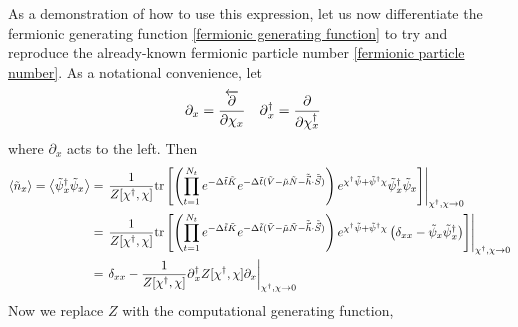 As a demonstration of how to use this expression, let us now differentiate the fermionic generating function \eqref{fermionic generating function} to try and reproduce the already-known fermionic particle number \eqref{fermionic particle number}.
As a notational convenience, let
\begin{align}
	\partial_x &= \frac{\overleftarrow{\partial}}{\partial \chi_x}
	&
	\partial{}^{\dagger}_x &= \frac{\partial}{\partial \chi{}^{\dagger}_x}
\end{align}
where $\partial_x$ acts to the left.
Then
\begin{align}
	\left\langle \tilde{n}_x \right\rangle
	=
	\left\langle \tilde{\psi}{}^{\dagger}_x \tilde{\psi}_x \right\rangle
	&=
	\left.\frac{1}{Z[\chi{}^{\dagger}, \chi]} \text{tr}\left[
		\left(
		\prod_{t=1}^{N_t}
		e^{-\Delta \tilde{t}\tilde{K}}
		e^{-\Delta \tilde{t} (\tilde{V} - \tilde{\mu} \tilde{N} - \tilde{\vec{h}}\cdot \tilde{\vec{S}})}
		\right)
		e^{\chi{}^{\dagger} \tilde{\psi} + \tilde{\psi}{}^{\dagger} \chi}
		\tilde{\psi}{}^{\dagger}_x \tilde{\psi}_x
	\right]\right|_{\chi{}^{\dagger}, \chi\rightarrow 0}
	\nonumber\\
	&=
	\left.\frac{1}{Z[\chi{}^{\dagger}, \chi]} \text{tr}\left[
		\left(
		\prod_{t=1}^{N_t}
		e^{-\Delta \tilde{t}\tilde{K}}
		e^{-\Delta \tilde{t} (\tilde{V} - \tilde{\mu} \tilde{N} - \tilde{\vec{h}}\cdot \tilde{\vec{S}})}
		\right)
		e^{\chi{}^{\dagger} \tilde{\psi} + \tilde{\psi}{}^{\dagger} \chi}
		\left(\delta_{xx} - \tilde{\psi}_x \tilde{\psi}{}^{\dagger}_x\right)
	\right]\right|_{\chi{}^{\dagger}, \chi\rightarrow 0}
	\nonumber\\
	&=
	\left. \delta_{xx} - \frac{1}{Z[\chi{}^{\dagger}, \chi]} \partial{}^{\dagger}_x Z[\chi{}^{\dagger}, \chi]\partial_x \right|_{\chi{}^{\dagger}, \chi\rightarrow0}
\end{align}
Now we replace $Z$ with the computational generating function,
